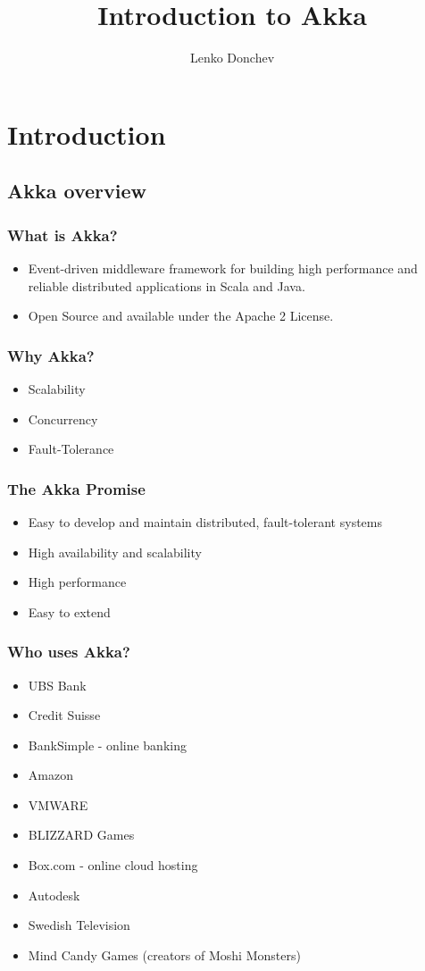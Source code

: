 \documentclass{beamer}
\title{Introduction to Akka}
\author{Lenko Donchev}
\begin{document}
\frame{\titlepage}

\section[Outline]{}
\frame{\tableofcontents}

\section{Introduction}
\subsection{Akka overview}

\frame
    {
      \frametitle{What is Akka?}
      
      \begin{itemize}
      \item Event-driven middleware framework for building high
        performance and reliable distributed applications in Scala and Java.
      \item  Open Source and available under the Apache 2 License.
      \end{itemize}
    }

\frame
    {
      \frametitle{Why Akka?}
      
      \begin{itemize}
      \item Scalability
      \item Concurrency
      \item Fault-Tolerance
      \end{itemize}
    }

\frame
    {
      \frametitle{The Akka Promise}

      \begin{itemize}
        \item Easy to develop and maintain distributed, fault-tolerant systems
        \item High availability and scalability
        \item High performance
        \item Easy to extend
      \end{itemize}
    }


\frame
    {
      \frametitle{Who uses Akka?}
      
      \begin{itemize}
      \item UBS Bank
      \item Credit Suisse
      \item BankSimple - online banking
      \item Amazon
      \item VMWARE  
      \item BLIZZARD Games
      \item Box.com - online cloud hosting
      \item Autodesk
      \item Swedish Television
      \item Mind Candy Games (creators of Moshi Monsters)
      \end{itemize}
    }
\end{document}
